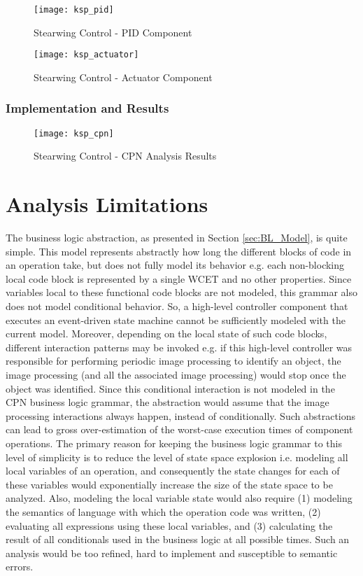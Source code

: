 \begin{figure}[h]
	\centering
	\texttt{[image: ksp\_pid]}
	\caption{Stearwing Control - PID Component}
	\label{fig:ksp_pid}
\end{figure} 
\FloatBarrier 

\begin{figure}[h]
	\centering
	\texttt{[image: ksp\_actuator]}
	\caption{Stearwing Control - Actuator Component}
	\label{fig:ksp_actuator}
\end{figure} 
\FloatBarrier 


\subsubsection{Implementation and Results}

\begin{figure}[h]
	\centering
	\texttt{[image: ksp\_cpn]}
	\caption{Stearwing Control - CPN Analysis Results}
	\label{fig:ksp_cpn}
\end{figure} 
\FloatBarrier 

\section{Analysis Limitations}

The business logic abstraction, as presented in Section \ref{sec:BL_Model}, is quite simple. This model represents abstractly how long the different blocks of code in an operation take, but does not fully model its behavior e.g. each non-blocking local code block is represented by a single WCET and no other properties. Since variables local to these functional code blocks are not modeled, this grammar also does not model conditional behavior. So, a high-level controller component that executes an event-driven state machine cannot be sufficiently modeled with the current model. Moreover, depending on the local state of such code blocks, different interaction patterns may be invoked e.g. if this high-level controller was responsible for performing periodic image processing to identify an object, the image processing (and all the associated image processing) would stop once the object was identified. Since this conditional interaction is not modeled in the CPN business logic grammar, the abstraction would assume that the image processing interactions always happen, instead of conditionally. Such abstractions can lead to gross over-estimation of the worst-case execution times of component operations. The primary reason for keeping the business logic grammar to this level of simplicity is to reduce the level of state space explosion i.e. modeling all local variables of an operation, and consequently the state changes for each of these variables would exponentially increase the size of the state space to be analyzed. Also, modeling the local variable state would also require (1) modeling the semantics of language with which the operation code was written, (2) evaluating all expressions using these local variables, and (3) calculating the result of all conditionals used in the business logic at all possible times. Such an analysis would be too refined, hard to implement and susceptible to semantic errors. 



